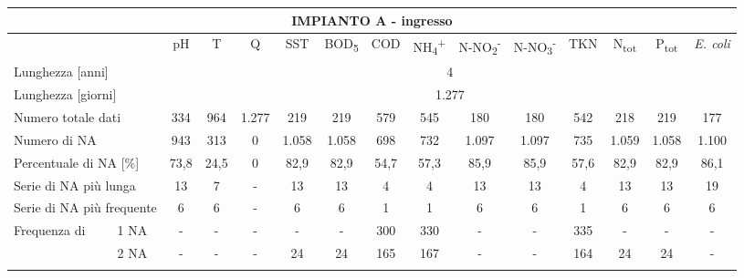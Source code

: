 \begin{sidewaystable}
\begin{center}
	\scriptsize
	\begin{tabular}{|ll|c|c|c|c|c|c|c|c|c|c|c|c|c|}
		\hline
		\multicolumn{15}{|c|}{\textbf{IMPIANTO A - ingresso}}                                                                                                   \\ \hline
		\multicolumn{2}{|l|}{}                           & pH   & T    & Q     & SST   & BOD\textsubscript{5}  & COD  & NH\textsubscript{4}\textsuperscript{+} & N-NO\textsubscript{2}\textsuperscript{-} & N-NO\textsubscript{3}\textsuperscript{-} & TKN  & N\textsubscript{tot}  & P\textsubscript{tot}  & \textit{E. coli} \\ \hline
		\multicolumn{2}{|l|}{Lunghezza {[}anni{]}}       & \multicolumn{13}{c|}{4}                                                                              \\ \hline
		\multicolumn{2}{|l|}{Lunghezza {[}giorni{]}}     & \multicolumn{13}{c|}{1.277}                                                                          \\ \hline
		\multicolumn{2}{|l|}{Numero totale dati}         & 334  & 964  & 1.277 & 219   & 219   & 579  & 545  & 180    & 180    & 542  & 218   & 219   & 177     \\ \hline
		\multicolumn{2}{|l|}{Numero di NA}               & 943  & 313  & 0     & 1.058 & 1.058 & 698  & 732  & 1.097  & 1.097  & 735  & 1.059 & 1.058 & 1.100   \\ \hline
		\multicolumn{2}{|l|}{Percentuale di NA {[}\%{]}} & 73,8 & 24,5 & 0     & 82,9  & 82,9  & 54,7 & 57,3 & 85,9   & 85,9   & 57,6 & 82,9  & 82,9  & 86,1    \\ \hline
		\multicolumn{2}{|l|}{Serie di NA più lunga}      & 13   & 7    & -     & 13    & 13    & 4    & 4    & 13     & 13     & 4    & 13    & 13    & 19      \\ \hline
		\multicolumn{2}{|l|}{Serie di NA più frequente}  & 6    & 6    & -     & 6     & 6     & 1    & 1    & 6      & 6      & 1    & 6     & 6     & 6       \\ \hline
		\multirow{11}{*}{Frequenza di}      & 1 NA       & -    & -    & -     & -     & -     & 300  & 330  & -      & -      & 335  & -     & -     & -       \\ \cline{3-15} 
		& 2 NA       & -    & -    & -     & 24    & 24    & 165  & 167  & -      & -      & 164  & 24    & 24    & -       \\ \cline{3-15} 

\end{tabular}
\end{center}
\end{sidewaystable}
